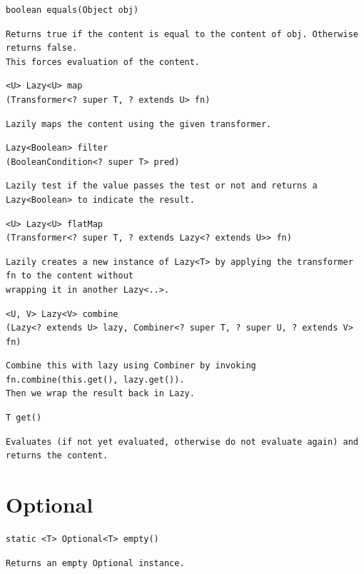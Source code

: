 \documentclass[5pt, portrait]{article}
\begin{document}
\begin{verbatim}
boolean equals(Object obj)
\end{verbatim}
\begin{verbatim}
Returns true if the content is equal to the content of obj. Otherwise returns false.
This forces evaluation of the content.
\end{verbatim}

\begin{verbatim}
<U> Lazy<U> map
(Transformer<? super T, ? extends U> fn)
\end{verbatim}
\begin{verbatim}
Lazily maps the content using the given transformer.
\end{verbatim}

\begin{verbatim}
Lazy<Boolean> filter
(BooleanCondition<? super T> pred)
\end{verbatim}
\begin{verbatim}
Lazily test if the value passes the test or not and returns a Lazy<Boolean> to indicate the result.
\end{verbatim}

\begin{verbatim}
<U> Lazy<U> flatMap
(Transformer<? super T, ? extends Lazy<? extends U>> fn)
\end{verbatim}
\begin{verbatim}
Lazily creates a new instance of Lazy<T> by applying the transformer fn to the content without
wrapping it in another Lazy<..>.
\end{verbatim}

\begin{verbatim}
<U, V> Lazy<V> combine
(Lazy<? extends U> lazy, Combiner<? super T, ? super U, ? extends V> fn)
\end{verbatim}
\begin{verbatim}
Combine this with lazy using Combiner by invoking fn.combine(this.get(), lazy.get()).
Then we wrap the result back in Lazy.
\end{verbatim}

\begin{verbatim}
T get()
\end{verbatim}
\begin{verbatim}
Evaluates (if not yet evaluated, otherwise do not evaluate again) and returns the content.
\end{verbatim}

\section{Optional}
\begin{verbatim}
static <T> Optional<T> empty()
\end{verbatim}
\begin{verbatim}
Returns an empty Optional instance.
\end{verbatim}
\end{document}
